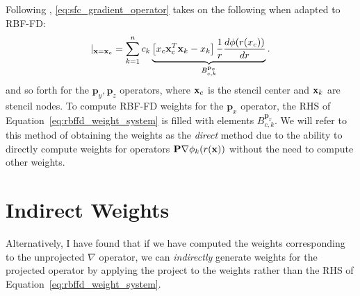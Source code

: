 Following \cite{FlyerLehto11}, \ref{eq:sfc_gradient_operator} takes on the following when adapted to RBF-FD:  
\begin{equation}
[ \mathbf{p}_{x} \cdot \nabla{f(\vx)}] |_{\vx = \vx_{c}} = \sum_{k=1}^{n} c_{k} \underbrace{\left[ x_{c} \vx_{c}^{T} \vx_{k} - x_{k} \right] \frac{1}{r} \d{\phi(r(x_{c}))}{r}}_{B_{c,k}^{\mathbf{p}_{x}}}. 
\label{eq:xsfc_operator_flyer_et_al}
\end{equation}
and so forth for the $\mathbf{p}_{y}, \mathbf{p}_{z}$ operators, where $\mathbf{x}_{c}$ is the stencil center and $\mathbf{x}_{k}$ are stencil nodes. To compute RBF-FD weights for the $\mathbf{p}_{x}$ operator, the RHS of Equation~\ref{eq:rbffd_weight_system} is filled with elements $B_{c,k}^{\mathbf{p}_{x}}$. We will refer to this method of obtaining the weights as the \emph{direct} method due to the ability to directly compute weights for operators $\mathbf{P} \nabla \phi_{k}(r(\mathbf{x}))$ without the need to compute other weights.

\section{Indirect Weights} 

Alternatively, I have found that if we have computed the weights corresponding to the unprojected $\nabla$ operator, we can \emph{indirectly} generate weights for the projected operator by applying the project to the weights rather than the RHS of Equation~\ref{eq:rbffd_weight_system}. 



